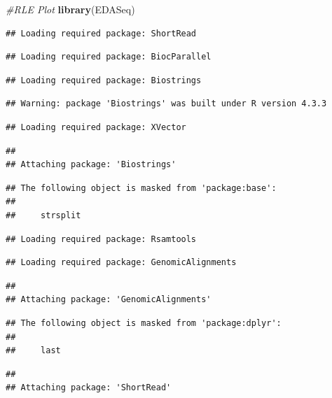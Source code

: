 \documentclass[
]{article}
\newenvironment{Shaded}{\begin{snugshade}}{\end{snugshade}}
\newcommand{\CommentTok}[1]{\textcolor[rgb]{0.56,0.35,0.01}{\textit{#1}}}
\newcommand{\FunctionTok}[1]{\textcolor[rgb]{0.13,0.29,0.53}{\textbf{#1}}}
\newcommand{\NormalTok}[1]{#1}
\begin{document}
\begin{Shaded}
\begin{Highlighting}[]
\CommentTok{\#RLE Plot}
\FunctionTok{library}\NormalTok{(EDASeq)}
\end{Highlighting}
\end{Shaded}

\begin{verbatim}
## Loading required package: ShortRead
\end{verbatim}

\begin{verbatim}
## Loading required package: BiocParallel
\end{verbatim}

\begin{verbatim}
## Loading required package: Biostrings
\end{verbatim}

\begin{verbatim}
## Warning: package 'Biostrings' was built under R version 4.3.3
\end{verbatim}

\begin{verbatim}
## Loading required package: XVector
\end{verbatim}

\begin{verbatim}
## 
## Attaching package: 'Biostrings'
\end{verbatim}

\begin{verbatim}
## The following object is masked from 'package:base':
## 
##     strsplit
\end{verbatim}

\begin{verbatim}
## Loading required package: Rsamtools
\end{verbatim}

\begin{verbatim}
## Loading required package: GenomicAlignments
\end{verbatim}

\begin{verbatim}
## 
## Attaching package: 'GenomicAlignments'
\end{verbatim}

\begin{verbatim}
## The following object is masked from 'package:dplyr':
## 
##     last
\end{verbatim}

\begin{verbatim}
## 
## Attaching package: 'ShortRead'
\end{verbatim}
\end{document}
